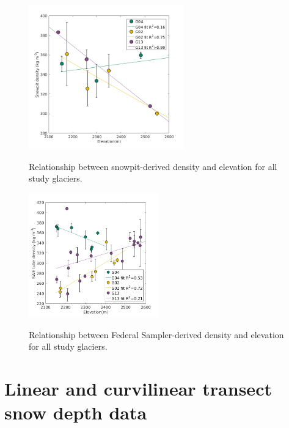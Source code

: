 \documentclass{sfuthesis}
\begin{document}
\begin{figure}[H]
	\centering
	\includegraphics[width = 0.6\textwidth]{ElevationVsSnowpit_all.png}\\
	\caption{Relationship between snowpit-derived density and elevation for all study glaciers.}
	\label{fig:elev_snowpit}
\end{figure}


\begin{figure}[H]
	\centering
	\includegraphics[width = 0.5\textwidth]{ElevationVsSWEtube_all.png}\\
	\caption{Relationship between Federal Sampler-derived density and elevation for all study glaciers.}
	\label{fig:elev_tube}
\end{figure}


\pagebreak

\section{Linear and curvilinear transect snow depth data}
\end{document}
